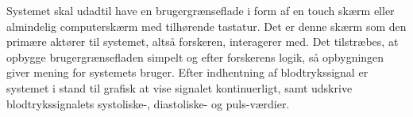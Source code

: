 Systemet skal udadtil have en brugergrænseflade i form af en touch skærm eller almindelig computerskærm med tilhørende tastatur. Det er denne skærm som den primære aktører til systemet, altså forskeren, interagerer med. Det tilstræbes, at opbygge brugergrænsefladen simpelt og efter forskerens logik, så opbygningen giver mening for systemets bruger. Efter indhentning af blodtrykssignal er systemet i stand til grafisk at vise signalet kontinuerligt, samt udskrive blodtrykssignalets systoliske-, diastoliske- og puls-værdier. 
